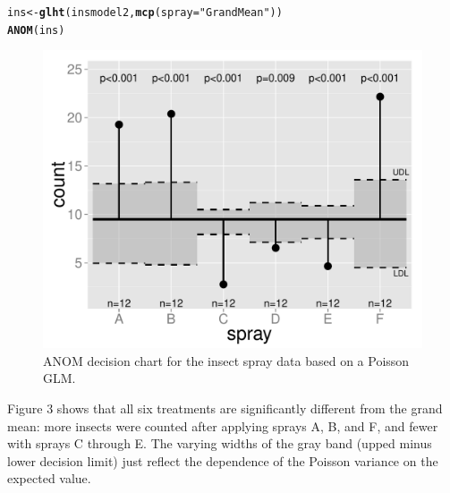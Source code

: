 \documentclass[a4paper]{article}\usepackage[]{graphicx}\usepackage[]{color}
\makeatletter
\def\maxwidth{ %
  \ifdim\Gin@nat@width>\linewidth
    \linewidth
  \else
    \Gin@nat@width
  \fi
}
\newcommand{\hlstr}[1]{\textcolor[rgb]{0.192,0.494,0.8}{#1}}%
\newcommand{\hlstd}[1]{\textcolor[rgb]{0.345,0.345,0.345}{#1}}%
\newcommand{\hlkwb}[1]{\textcolor[rgb]{0.69,0.353,0.396}{#1}}%
\newcommand{\hlkwc}[1]{\textcolor[rgb]{0.333,0.667,0.333}{#1}}%
\newcommand{\hlkwd}[1]{\textcolor[rgb]{0.737,0.353,0.396}{\textbf{#1}}}%
\newenvironment{kframe}{%
 \def\at@end@of@kframe{}%
 \ifinner\ifhmode%
  \def\at@end@of@kframe{\end{minipage}}%
  \begin{minipage}{\columnwidth}%
 \fi\fi%
 \def\FrameCommand##1{\hskip\@totalleftmargin \hskip-\fboxsep
 \colorbox{shadecolor}{##1}\hskip-\fboxsep
     \hskip-\linewidth \hskip-\@totalleftmargin \hskip\columnwidth}%
 \MakeFramed {\advance\hsize-\width
   \@totalleftmargin\z@ \linewidth\hsize
   \@setminipage}}%
 {\par\unskip\endMakeFramed%
 \at@end@of@kframe}
\newenvironment{knitrout}{}{} %
\makeatother
\begin{document}
\begin{knitrout}
\color{fgcolor}\begin{kframe}
\begin{alltt}
\hlstd{ins} \hlkwb{<-} \hlkwd{glht}\hlstd{(insmodel2,} \hlkwd{mcp}\hlstd{(}\hlkwc{spray}\hlstd{=}\hlstr{"GrandMean"}\hlstd{))}
\hlkwd{ANOM}\hlstd{(ins)}
\end{alltt}
\end{kframe}\begin{figure}
\includegraphics[width=\maxwidth]{figure/INSECTS2a-1} \caption[ANOM decision chart for the insect spray data based on a Poisson GLM]{ANOM decision chart for the insect spray data based on a Poisson GLM.}\label{fig:INSECTS2a}
\end{figure}


\end{knitrout}

Figure 3 shows that all six treatments are significantly different from the grand mean: more insects were counted after applying sprays A, B, and F, and fewer with sprays C through E. The varying widths of the gray band (upped minus lower decision limit) just reflect the dependence of the Poisson variance on the expected value.

\clearpage

\end{document}
